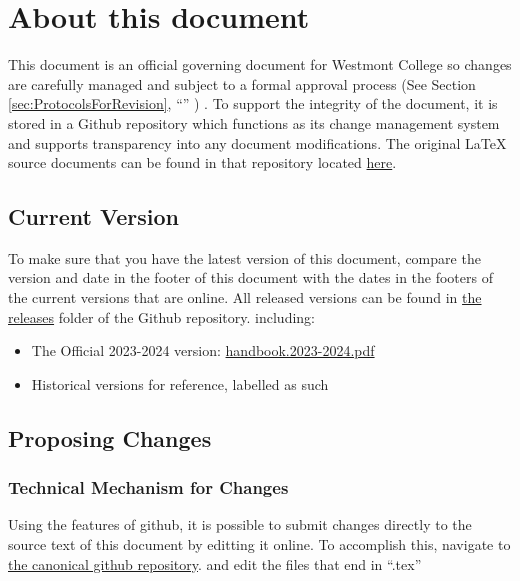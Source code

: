 \section{About this document}
	\label{sec:AboutThisDocument}

	This document is an official governing document for Westmont College so changes are carefully managed and subject to a formal approval process
	(See Section
	\ref{sec:ProtocolsForRevision},
	``''
	) .
	To support the integrity of the document, it is stored in a Github repository which functions as its change management system and supports transparency into any document modifications.
	The original LaTeX source documents can be found in that repository located
	\href{https://github.com/jaron-burdick/WestmontFacultyHandbook}{here}.


	\subsection{Current Version}


		To make sure that you have the latest version of this document, compare the version and date in the
		footer of this document with the dates in the footers of the current versions that are online.
		All released versions can be found in
		\href{https://github.com/jaron-burdick/WestmontFacultyHandbook/tree/Official-2023-2024-RC/releases}{the releases} folder of the Github repository.
		including:
		\begin{itemize}
			\item{The Official 2023-2024 version: \href{https://github.com/djp3/WestmontFacultyHandbook/tree/Official-2023-2024-RC/releases}{handbook.2023-2024.pdf}}
			\item{Historical versions for reference, labelled as such}
		\end{itemize}

	\subsection{Proposing Changes}
		\subsubsection{Technical Mechanism for Changes}
			Using the features of github, it is possible to submit changes
			directly to the source text of this document by editting
			it online. To accomplish this,
			navigate to
			\href{https://github.com/jaron-burdick/WestmontFacultyHandbook}{the canonical github repository}.
			and
			edit the files that end in ``.tex''

